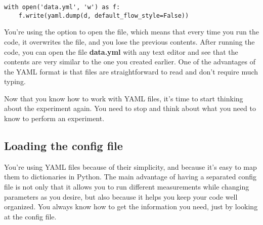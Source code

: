 \begin{verbatim}
with open('data.yml', 'w') as f:
    f.write(yaml.dump(d, default_flow_style=False))
\end{verbatim}

You're using the  option to open the file, which means that every time you run the code, it overwrites the file, and you lose the previous contents. After running the code, you can open the file \textbf{data.yml} with any text editor and see that the contents are very similar to the one you created earlier. One of the advantages of the YAML format is that files are straightforward to read and don't require much typing.





Now that you know how to work with YAML files, it's time to start thinking about the experiment again. You need to stop and think about what you need to know to perform an experiment.


\subsection{Loading the config file}\label{subsec:loading-the-config}
You're using YAML files because of their simplicity, and because it's easy to map them to dictionaries in Python. The main advantage of having a separated config file is not only that it allows you to run different measurements while changing parameters as you desire, but also because it helps you keep your code well organized. You always know how to get the information you need, just by looking at the config file.

